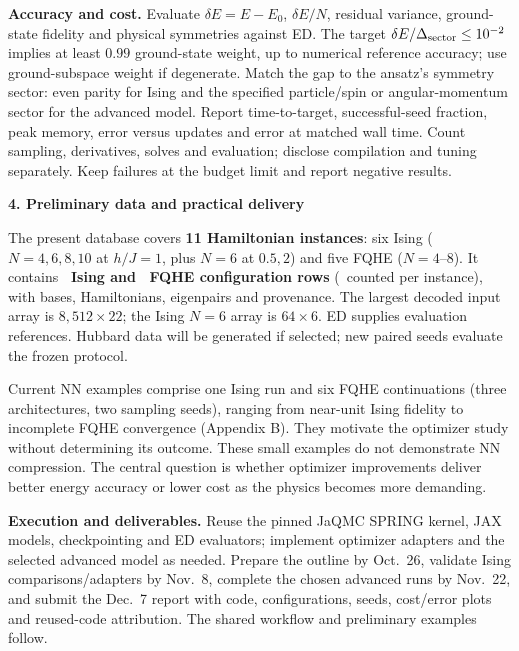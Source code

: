 \documentclass[10pt,letterpaper]{article}
\newcommand{\topic}[1]{\vspace{4pt}\textbf{\color{ink}#1}\par}
\begin{document}
\textbf{Accuracy and cost.} Evaluate $\delta E=E-E_0$, $\delta E/N$, residual variance, ground-state fidelity and physical symmetries against ED. The target $\delta E/\Delta_{\rm sector}\leq10^{-2}$ implies at least $0.99$ ground-state weight, up to numerical reference accuracy; use ground-subspace weight if degenerate. Match the gap to the ansatz's symmetry sector: even parity for Ising and the specified particle/spin or angular-momentum sector for the advanced model. Report time-to-target, successful-seed fraction, peak memory, error versus updates and error at matched wall time. Count sampling, derivatives, solves and evaluation; disclose compilation and tuning separately. Keep failures at the budget limit and report negative results.

\topic{4. Preliminary data and practical delivery}
The present database covers \textbf{11 Hamiltonian instances}: six Ising ($N=4,6,8,10$ at $h/J=1$, plus $N=6$ at $0.5,2$) and five FQHE ($N=4$--8). It contains \textbf{\IsingConfigRows\ Ising and \FQHEConfigRows\ FQHE configuration rows} (\TotalConfigRows\ counted per instance), with bases, Hamiltonians, eigenpairs and provenance. The largest decoded input array is \textbf{$8,512\times22$}; the Ising $N=6$ array is $64\times6$. ED supplies evaluation references. Hubbard data will be generated if selected; new paired seeds evaluate the frozen protocol.

Current NN examples comprise one Ising run and six FQHE continuations (three architectures, two sampling seeds), ranging from near-unit Ising fidelity to incomplete FQHE convergence (Appendix B). They motivate the optimizer study without determining its outcome. These small examples do not demonstrate NN compression. The central question is whether optimizer improvements deliver better energy accuracy or lower cost as the physics becomes more demanding.

\textbf{Execution and deliverables.} Reuse the pinned JaQMC SPRING kernel, JAX models, checkpointing and ED evaluators; implement optimizer adapters and the selected advanced model as needed. Prepare the outline by Oct.~26, validate Ising comparisons/adapters by Nov.~8, complete the chosen advanced runs by Nov.~22, and submit the Dec.~7 report with code, configurations, seeds, cost/error plots and reused-code attribution. The shared workflow and preliminary examples follow.
\end{document}
